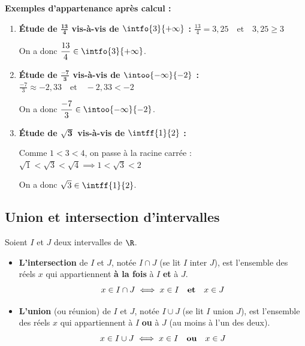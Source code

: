 \begin{ex}
	\textbf{Exemples d'appartenance après calcul :}

	\begin{enumerate}
		\item \textbf{Étude de $\mathbf{\frac{13}{4}}$ vis-à-vis de $\intfo{3}{+\infty}$ :} \quad $\frac{13}{4} = 3{,}25 \quad \text{et} \quad 3{,}25 \geqslant 3$

		      On a donc $\dfrac{13}{4} \in \intfo{3}{+\infty}$.

		\item \textbf{Étude de $\mathbf{\frac{-7}{3}}$ vis-à-vis de $\intoo{-\infty}{-2}$ :} \quad $\frac{-7}{3} \approx -2{,}33 \quad \text{et} \quad -2{,}33 < -2$

		      On a donc $\dfrac{-7}{3} \in \intoo{-\infty}{-2}$.

		\item \textbf{Étude de $\mathbf{\sqrt{3}}$ vis-à-vis de $\intff{1}{2}$ :}

		      Comme $1 < 3 < 4$, on passe à la racine carrée : \quad $\sqrt{1} < \sqrt{3} < \sqrt{4} \implies 1 < \sqrt{3} < 2$

		      On a donc $\sqrt{3} \in \intff{1}{2}$.
	\end{enumerate}
\end{ex}

\subsection{Union et intersection d'intervalles}

\begin{df}
	Soient $I$ et $J$ deux intervalles de $\R$.
	\begin{itemize}
		\item \textbf{L'intersection} de $I$ et $J$, notée $I \cap J$ (se lit \og{}$I$ inter $J$\fg{}), est l'ensemble des réels $x$ qui appartiennent \textbf{à la fois} à $I$ \textbf{et} à $J$.
		      \[
			      x \in I \cap J \iff x \in I \quad \text{\textbf{et}} \quad x \in J
		      \]
		\item \textbf{L'union} (ou réunion) de $I$ et $J$, notée $I \cup J$ (se lit \og{}$I$ union $J$\fg{}), est l'ensemble des réels $x$ qui appartiennent à $I$ \textbf{ou} à $J$ (au moins à l'un des deux).
		      \[
			      x \in I \cup J \iff x \in I \quad \text{\textbf{ou}} \quad x \in J
		      \]
	\end{itemize}
\end{df}

